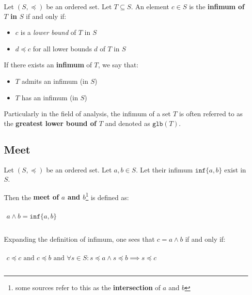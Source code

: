 Let $(S, \preceq)$ be an ordered set. Let $T \subseteq S$. An element
$c \in S$ is the \textbf{infimum of $T$ in $S$} if and only if:

\begin{itemize}
\item $c$ is a \textit{lower bound} of $T$ in $S$
\item $d \preceq c$ for all lower bounds $d$ of $T$ in $S$
\end{itemize}

If there exists an \textbf{infimum} of $T$, we say that:

\begin{itemize}
\item $T$ admits an infimum (in $S$)
\item $T$ has an infimum (in $S$)
\end{itemize}


Particularly in the field of analysis, the infimum of a set $T$ is
often referred to as the \textbf{greatest lower bound of $T$} and
denoted as $\mathtt{glb}(T)$.


\subsection{Meet}
\label{sec:meet}

Let $(S, \preceq)$ be an ordered set. Let $a, b \in S$. Let their
infimum $\mathtt{inf} \{a, b\}$ exist in $S$.

Then the \textbf{meet of $a$ and $b$}\footnote{some sources refer to
  this as the \textbf{intersection} of $a$ and $b$} is defined as:

\begin{math}
  \begin{array}{c}
    \\
    a \wedge b =\mathtt{inf} \{ a, b \}\\
    \\
  \end{array}
\end{math}


Expanding the definition of infimum, one sees that $c = a \wedge b$ if
and only if:

\begin{math}
  \begin{array}{c}
    \\
    c \preceq c\text{ and }c \preceq b\text{ and } \forall s \in S: s \preceq a \land s \preceq b \implies s \preceq c\\
    \\
  \end{array}
\end{math}


